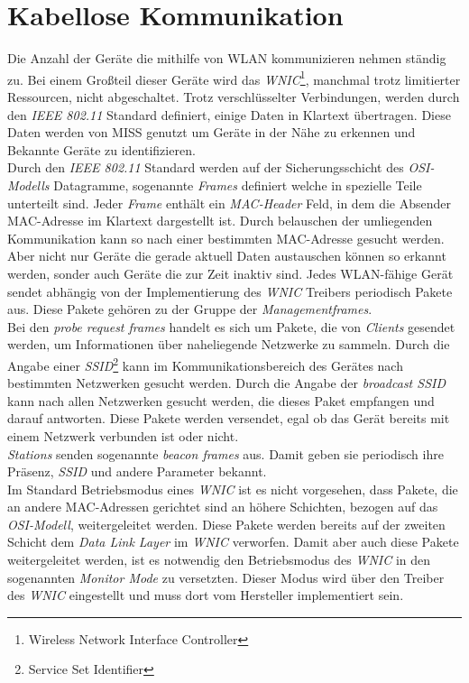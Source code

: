 \documentclass[]{report}
\begin{document}
\section{Kabellose Kommunikation}
Die Anzahl der Geräte die mithilfe von WLAN kommunizieren nehmen ständig zu. Bei einem Großteil dieser Geräte wird das \textit{WNIC}\footnote{Wireless Network Interface Controller}, manchmal trotz limitierter Ressourcen, nicht abgeschaltet. Trotz verschlüsselter Verbindungen, werden durch den \textit{IEEE 802.11} Standard \cite{IEEE} definiert, einige Daten in Klartext übertragen. Diese Daten werden von MISS genutzt um Geräte in der Nähe zu erkennen und Bekannte Geräte zu identifizieren. \\
Durch den \textit{IEEE 802.11} Standard werden auf der Sicherungsschicht des \textit{OSI-Modells} \cite{OSI}  Datagramme, sogenannte \textit{Frames} definiert welche in spezielle Teile unterteilt sind. Jeder \textit{Frame} enthält ein \textit{MAC-Header} Feld, in dem die Absender MAC-Adresse im Klartext dargestellt ist. Durch belauschen der umliegenden Kommunikation kann so nach einer bestimmten MAC-Adresse gesucht werden. \\
Aber nicht nur Geräte die gerade aktuell Daten austauschen können so erkannt werden, sonder auch Geräte die zur Zeit inaktiv sind. Jedes WLAN-fähige Gerät sendet abhängig von der Implementierung des \textit{WNIC} Treibers periodisch Pakete aus. Diese Pakete gehören zu der Gruppe der \textit{Managementframes}. \\
Bei den \textit{probe request frames} handelt es sich um Pakete, die von \textit{Clients} gesendet werden, um Informationen über naheliegende Netzwerke zu sammeln. Durch die Angabe einer \textit{SSID}\footnote{Service Set Identifier} kann im Kommunikationsbereich des Gerätes nach bestimmten Netzwerken gesucht werden. Durch die Angabe der \textit{broadcast SSID} kann nach allen Netzwerken gesucht werden, die dieses Paket empfangen und darauf antworten. Diese Pakete werden versendet, egal ob das Gerät bereits mit einem Netzwerk verbunden ist oder nicht.\\
\textit{Stations} senden sogenannte \textit{beacon frames} aus. Damit geben sie periodisch ihre Präsenz, \textit{SSID} und andere Parameter bekannt. \\
Im Standard Betriebsmodus eines \textit{WNIC} ist es nicht vorgesehen, dass Pakete, die an andere MAC-Adressen gerichtet sind an höhere Schichten, bezogen auf das \textit{OSI-Modell}, weitergeleitet werden. Diese Pakete werden bereits auf der zweiten Schicht dem \textit{Data Link Layer} im \textit{WNIC} verworfen. Damit aber auch diese Pakete weitergeleitet werden, ist es notwendig den Betriebsmodus des \textit{WNIC} in den sogenannten \textit{Monitor Mode} zu versetzten. Dieser Modus wird über den Treiber des \textit{WNIC} eingestellt und muss dort vom Hersteller implementiert sein. 
\end{document}
